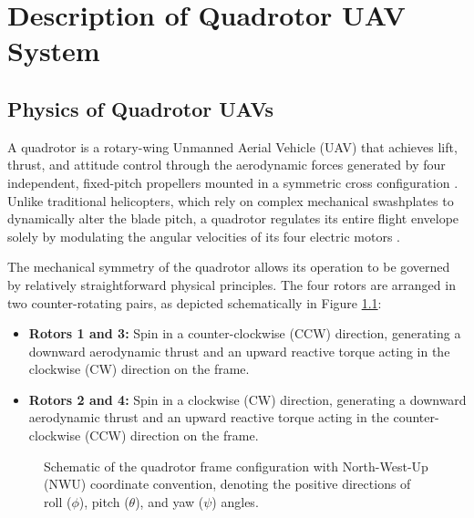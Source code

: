 \chapter{Description of Quadrotor UAV System}
\label{ch:sys_desc}

\section{Physics of Quadrotor UAVs}
A quadrotor is a rotary-wing Unmanned Aerial Vehicle (UAV) that achieves lift, thrust, and attitude control through the aerodynamic forces generated by four independent, fixed-pitch propellers mounted in a symmetric cross configuration \cite{ref_39}. Unlike traditional helicopters, which rely on complex mechanical swashplates to dynamically alter the blade pitch, a quadrotor regulates its entire flight envelope solely by modulating the angular velocities of its four electric motors \cite{ref_41}.

The mechanical symmetry of the quadrotor allows its operation to be governed by relatively straightforward physical principles. The four rotors are arranged in two counter-rotating pairs, as depicted schematically in Figure \ref{fig:quadcopter_nwu_frame}:
\begin{itemize}
    \item \textbf{Rotors 1 and 3:} Spin in a counter-clockwise (CCW) direction, generating a downward aerodynamic thrust and an upward reactive torque acting in the clockwise (CW) direction on the frame.
    \item \textbf{Rotors 2 and 4:} Spin in a clockwise (CW) direction, generating a downward aerodynamic thrust and an upward reactive torque acting in the counter-clockwise (CCW) direction on the frame.
\end{itemize}

\begin{figure}[h!]
\centering
{}
\caption{Schematic of the quadrotor frame configuration with North-West-Up (NWU) coordinate convention, denoting the positive directions of roll ($\phi$), pitch ($\theta$), and yaw ($\psi$) angles.}
\label{fig:quadcopter_nwu_frame}
\end{figure}

